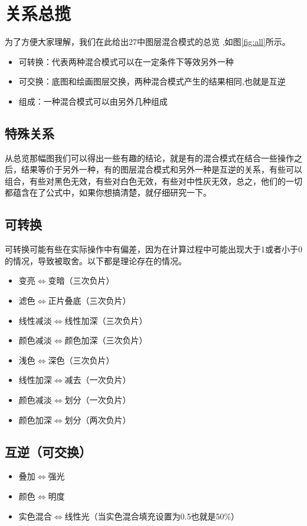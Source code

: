 \section{ 关系总揽}
为了方便大家理解，我们在此给出27中图层混合模式的总览 ,如图\ref{fig:all}所示。

\begin{itemize}
	\item 可转换：代表两种混合模式可以在一定条件下等效另外一种
	\item 可交换：底图和绘画图层交换，两种混合模式产生的结果相同,也就是互逆
	\item 组成：一种混合模式可以由另外几种组成
\end{itemize}

\subsection{ 特殊关系}
从总览那幅图我们可以得出一些有趣的结论，就是有的混合模式在结合一些操作之后，结果等价于另外一种，有的图层混合模式和另外一种是互逆的关系，有些可以组合，有些对黑色无效，有些对白色无效，有些对中性灰无效，总之，他们的一切都蕴含在了公式中，如果你想搞清楚，就仔细研究一下。
\subsection{ 可转换}
可转换可能有些在实际操作中有偏差，因为在计算过程中可能出现大于1或者小于0的情况，导致被取舍。以下都是理论存在的情况。
\begin{itemize}
	\item 变亮$\Leftrightarrow$变暗（三次负片）
	\item 滤色$\Leftrightarrow$正片叠底（三次负片）
	\item 线性减淡$\Leftrightarrow$线性加深（三次负片）
	\item 颜色减淡$\Leftrightarrow$颜色加深（三次负片）
	\item 浅色$\Leftrightarrow$深色（三次负片）
	\item 线性加深$\Leftrightarrow$减去（一次负片）
	\item 颜色减淡$\Leftrightarrow$划分（一次负片）
	\item 颜色加深$\Leftrightarrow$划分（两次负片）
\end{itemize}

\subsection{ 互逆（可交换）}
\begin{itemize}
	\item 叠加$\Leftrightarrow$强光
	\item 颜色$\Leftrightarrow$明度
	\item 实色混合$\Leftrightarrow$线性光（当实色混合填充设置为0.5也就是50\%）
\end{itemize}
